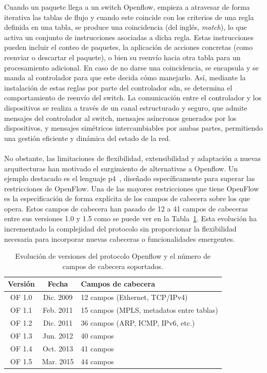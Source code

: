Cuando un paquete llega a un switch Openflow, empieza a atravesar de forma iterativa las tablas de flujo y cuando este coincide con los criterios de una regla definida en una tabla, se produce una coincidencia (del inglés, \textit{match}), lo que activa un conjunto de instrucciones asociadas a dicha regla. Estas instrucciones pueden incluir el conteo de paquetes, la aplicación de acciones concretas (como reenviar o descartar el paquete), o bien su reenvío hacia otra tabla para un procesamiento adicional. En caso de no darse una coincidencia, se encapsula y se manda al controlador para que este decida cómo manejarlo. Así, mediante la instalación de estas reglas por parte del controlador \gls{sdn}, se determina el comportamiento de reenvío del switch. La comunicación entre el controlador y los dispositivos se realiza a través de un canal estructurado y seguro, que admite mensajes del controlador al switch, mensajes asíncronos generados por los dispositivos, y mensajes simétricos intercambiables por ambas partes, permitiendo una gestión eficiente y dinámica del estado de la red.\\
\\
No obstante, las limitaciones de flexibilidad, extensibilidad y adaptación a nuevas arquitecturas han motivado el surgimiento de alternativas a Openflow. Un ejemplo destacado es el lenguaje \gls{p4}~\cite{bosshart2014p4}, diseñado específicamente para superar las restricciones de OpenFlow. Una de las mayores restricciones que tiene OpenFlow es la especificación de forma explícita de los campos de cabecera sobre los que opera. Estos campos de cabecera han pasado de 12 a 41 campos de cabeceras entre sus versiones 1.0 y 1.5 como se puede ver en la Tabla~\ref{tab:openflow_versions}. Esta evolución ha incrementado la complejidad del protocolo sin proporcionar la flexibilidad necesaria para incorporar nuevas cabeceras o funcionalidades emergentes. 

\begin{table}[ht!]
\centering
\begin{tabular}{|c|c|l|}
\hline
\textbf{Versión} & \textbf{Fecha} & \textbf{Campos de cabecera} \\ \hline
OF 1.0 & Dic. 2009 & 12 campos (Ethernet, TCP/IPv4) \\ \hline
OF 1.1 & Feb. 2011 & 15 campos (MPLS, metadatos entre tablas) \\ \hline
OF 1.2 & Dic. 2011 & 36 campos (ARP, ICMP, IPv6, etc.) \\ \hline
OF 1.3 & Jun. 2012 & 40 campos \\ \hline
OF 1.4 & Oct. 2013 & 41 campos \\ \hline
OF 1.5 & Mar. 2015 & 44 campos \\ \hline
\end{tabular}
\caption{Evolución de versiones del protocolo Openflow y el número de campos de cabecera soportados.}    
\label{tab:openflow_versions}
\end{table}

